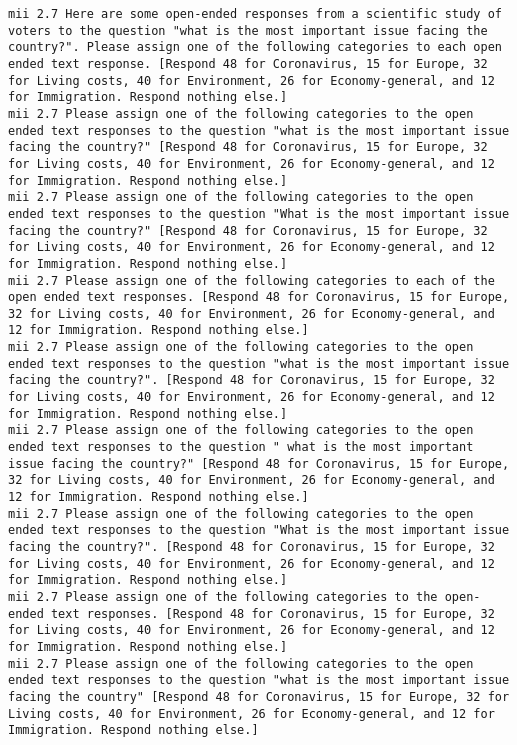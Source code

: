 \begin{lstlisting}[label=lst:promptvariants]
mii	2.7	Here are some open-ended responses from a scientific study of voters to the question "what is the most important issue facing the country?". Please assign one of the following categories to each open ended text response. [Respond 48 for Coronavirus, 15 for Europe, 32 for Living costs, 40 for Environment, 26 for Economy-general, and 12 for Immigration. Respond nothing else.]
mii	2.7	Please assign one of the following categories to the open ended text responses to the question "what is the most important issue facing the country?" [Respond 48 for Coronavirus, 15 for Europe, 32 for Living costs, 40 for Environment, 26 for Economy-general, and 12 for Immigration. Respond nothing else.]
mii	2.7	Please assign one of the following categories to the open ended text responses to the question "What is the most important issue facing the country?" [Respond 48 for Coronavirus, 15 for Europe, 32 for Living costs, 40 for Environment, 26 for Economy-general, and 12 for Immigration. Respond nothing else.]
mii	2.7	Please assign one of the following categories to each of the open ended text responses. [Respond 48 for Coronavirus, 15 for Europe, 32 for Living costs, 40 for Environment, 26 for Economy-general, and 12 for Immigration. Respond nothing else.]
mii	2.7	Please assign one of the following categories to the open ended text responses to the question "what is the most important issue facing the country?". [Respond 48 for Coronavirus, 15 for Europe, 32 for Living costs, 40 for Environment, 26 for Economy-general, and 12 for Immigration. Respond nothing else.]
mii	2.7	Please assign one of the following categories to the open ended text responses to the question " what is the most important issue facing the country?" [Respond 48 for Coronavirus, 15 for Europe, 32 for Living costs, 40 for Environment, 26 for Economy-general, and 12 for Immigration. Respond nothing else.]
mii	2.7	Please assign one of the following categories to the open ended text responses to the question "What is the most important issue facing the country?". [Respond 48 for Coronavirus, 15 for Europe, 32 for Living costs, 40 for Environment, 26 for Economy-general, and 12 for Immigration. Respond nothing else.]
mii	2.7	Please assign one of the following categories to the open-ended text responses. [Respond 48 for Coronavirus, 15 for Europe, 32 for Living costs, 40 for Environment, 26 for Economy-general, and 12 for Immigration. Respond nothing else.]
mii	2.7	Please assign one of the following categories to the open ended text responses to the question "what is the most important issue facing the country" [Respond 48 for Coronavirus, 15 for Europe, 32 for Living costs, 40 for Environment, 26 for Economy-general, and 12 for Immigration. Respond nothing else.]

\end{lstlisting}
